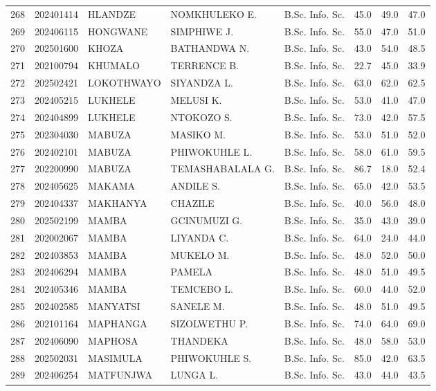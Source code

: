 \documentclass[12pt]{article}
\begin{document}
\begin{longtable}{@{}llllllll@{}}
268 & 202401414 & HLANDZE & NOMKHULEKO E. & B.Sc. Info. Sc. & 45.0 & 49.0 & 47.0 \\
269 & 202406115 & HONGWANE & SIMPHIWE J. & B.Sc. Info. Sc. & 55.0 & 47.0 & 51.0 \\
270 & 202501600 & KHOZA & BATHANDWA N. & B.Sc. Info. Sc. & 43.0 & 54.0 & 48.5 \\
271 & 202100794 & KHUMALO & TERRENCE B. & B.Sc. Info. Sc. & 22.7 & 45.0 & 33.9 \\
272 & 202502421 & LOKOTHWAYO & SIYANDZA L. & B.Sc. Info. Sc. & 63.0 & 62.0 & 62.5 \\
273 & 202405215 & LUKHELE & MELUSI K. & B.Sc. Info. Sc. & 53.0 & 41.0 & 47.0 \\
274 & 202404899 & LUKHELE & NTOKOZO S. & B.Sc. Info. Sc. & 73.0 & 42.0 & 57.5 \\
275 & 202304030 & MABUZA & MASIKO M. & B.Sc. Info. Sc. & 53.0 & 51.0 & 52.0 \\
276 & 202402101 & MABUZA & PHIWOKUHLE L. & B.Sc. Info. Sc. & 58.0 & 61.0 & 59.5 \\
277 & 202200990 & MABUZA & TEMASHABALALA G. & B.Sc. Info. Sc. & 86.7 & 18.0 & 52.4 \\
278 & 202405625 & MAKAMA & ANDILE S. & B.Sc. Info. Sc. & 65.0 & 42.0 & 53.5 \\
279 & 202404337 & MAKHANYA & CHAZILE & B.Sc. Info. Sc. & 40.0 & 56.0 & 48.0 \\
280 & 202502199 & MAMBA & GCINUMUZI G. & B.Sc. Info. Sc. & 35.0 & 43.0 & 39.0 \\
281 & 202002067 & MAMBA & LIYANDA C. & B.Sc. Info. Sc. & 64.0 & 24.0 & 44.0 \\
282 & 202403853 & MAMBA & MUKELO M. & B.Sc. Info. Sc. & 48.0 & 52.0 & 50.0 \\
283 & 202406294 & MAMBA & PAMELA & B.Sc. Info. Sc. & 48.0 & 51.0 & 49.5 \\
284 & 202405346 & MAMBA & TEMCEBO L. & B.Sc. Info. Sc. & 60.0 & 44.0 & 52.0 \\
285 & 202402585 & MANYATSI & SANELE M. & B.Sc. Info. Sc. & 48.0 & 51.0 & 49.5 \\
286 & 202101164 & MAPHANGA & SIZOLWETHU P. & B.Sc. Info. Sc. & 74.0 & 64.0 & 69.0 \\
287 & 202406090 & MAPHOSA & THANDEKA & B.Sc. Info. Sc. & 48.0 & 58.0 & 53.0 \\
288 & 202502031 & MASIMULA & PHIWOKUHLE S. & B.Sc. Info. Sc. & 85.0 & 42.0 & 63.5 \\
289 & 202406254 & MATFUNJWA & LUNGA L. & B.Sc. Info. Sc. & 43.0 & 44.0 & 43.5 \\

\end{longtable}
\end{document}
